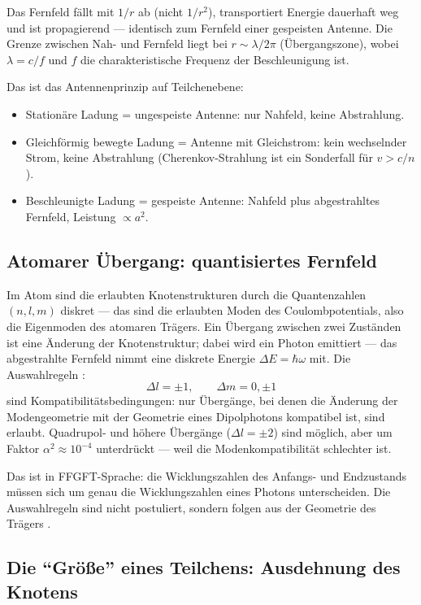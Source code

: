 Das Fernfeld fällt mit $1/r$ ab (nicht $1/r^2$), transportiert Energie
dauerhaft weg und ist propagierend --- identisch zum Fernfeld einer
gespeisten Antenne. Die Grenze zwischen Nah- und Fernfeld liegt bei
$r \sim \lambda/2\pi$ (Übergangszone), wobei $\lambda = c/f$ und $f$
die charakteristische Frequenz der Beschleunigung ist.

Das ist das Antennenprinzip auf Teilchenebene:
\begin{itemize}[nosep]
  \item Stationäre Ladung = ungespeiste Antenne: nur Nahfeld,
    keine Abstrahlung.
  \item Gleichförmig bewegte Ladung = Antenne mit Gleichstrom:
    kein wechselnder Strom, keine Abstrahlung (Cherenkov-Strahlung
    ist ein Sonderfall für $v > c/n$).
  \item Beschleunigte Ladung = gespeiste Antenne: Nahfeld plus
    abgestrahltes Fernfeld, Leistung $\propto a^2$.
\end{itemize}

\subsection*{Atomarer Übergang: quantisiertes Fernfeld}

Im Atom sind die erlaubten Knotenstrukturen durch die Quantenzahlen
$(n, l, m)$ diskret --- das sind die erlaubten Moden des Coulombpotentials,
also die Eigenmoden des atomaren Trägers. Ein Übergang zwischen zwei
Zuständen ist eine Änderung der Knotenstruktur; dabei wird ein Photon
emittiert --- das abgestrahlte Fernfeld nimmt eine diskrete Energie
$\Delta E = \hbar\omega$ mit. Die Auswahlregeln \cite{CohenTannoudji1977,Griffiths1995}:
\[
  \Delta l = \pm 1, \qquad \Delta m = 0,\pm 1
\]
sind Kompatibilitätsbedingungen: nur Übergänge, bei denen die
Änderung der Modengeometrie mit der Geometrie eines Dipolphotons
kompatibel ist, sind erlaubt. Quadrupol- und höhere Übergänge
($\Delta l = \pm 2$) sind möglich, aber um Faktor $\alpha^2 \approx 10^{-4}$
unterdrückt --- weil die Modenkompatibilität schlechter ist.

Das ist in FFGFT-Sprache: die Wicklungszahlen des Anfangs- und
Endzustands müssen sich um genau die Wicklungszahlen eines Photons
unterscheiden. Die Auswahlregeln sind nicht postuliert, sondern
folgen aus der Geometrie des Trägers \SM.

\subsection*{Die ``Größe'' eines Teilchens: Ausdehnung des Knotens}

